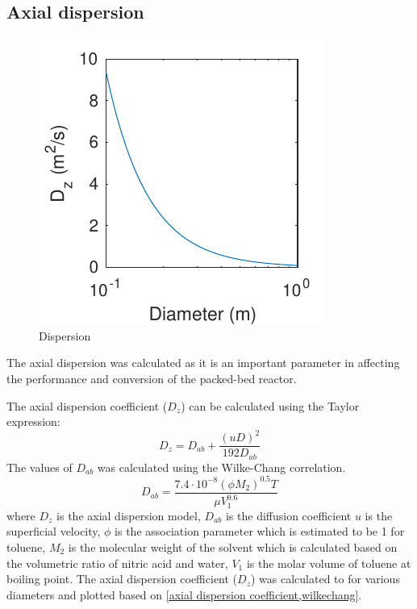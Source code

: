 \subsection{Axial dispersion}
\label{sec:axialdispersion}

\begin{figure}
    \vspace{-\intextsep}
    \includegraphics[scale=0.8]{figures/D_z}
    \caption{Dispersion}
    \label{fig:dispersion}
\end{figure}
The axial dispersion was calculated as it is an important parameter in affecting the performance and conversion of the packed-bed reactor. 

The axial dispersion coefficient ($D_z$) can be calculated using the Taylor expression: 
\begin{equation}
    D_z=D_{ab}+\frac{(uD)^2}{192D_{ab}}
    \label{axial dispersion coefficient}
\end{equation}
The values of $D_{ab}$ was calculated using the Wilke-Chang correlation.
\begin{equation}
    D_{ab}=\frac{7.4\cdot 10^{-8}(\phi M_2)^{0.5}T}{\mu V_1^{0.6}}
    \label{wilkechang}
\end{equation}
where $D_z$ is the axial dispersion model, $D_{ab}$ is the diffusion coefficient $u$ is the superficial velocity, $\phi$ is the association parameter which is estimated to be 1 for toluene, $M_2$ is the molecular weight of the solvent which is calculated based on the volumetric ratio of nitric acid and water, $V_1$ is the molar volume of toluene at boiling point.
The axial dispersion coefficient ($D_z$) was calculated to for various diameters and plotted based on \cref{axial dispersion coefficient,wilkechang}.

